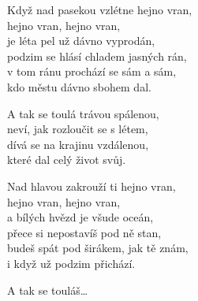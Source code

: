 
\ve{}
Když nad pasekou vzlétne hejno vran,\\
hejno vran, hejno vran,\\
je léta pel už dávno vyprodán,\\
podzim se hlásí chladem jasných rán,\\
v tom ránu prochází se sám a sám,\\
kdo městu dávno sbohem dal.

\cho{}
A tak se toulá trávou spálenou,\\
neví, jak rozloučit se s létem,\\
dívá se na krajinu vzdálenou,\\
které dal celý život svůj.

\ve{}
Nad hlavou zakrouží ti hejno vran,\\
hejno vran, hejno vran,\\
a bílých hvězd je všude oceán,\\
přece si nepostavíš pod ně stan,\\
budeš spát pod širákem, jak tě znám,\\
i když už podzim přichází.

\cho{}
A tak se touláš\ldots 

\esong